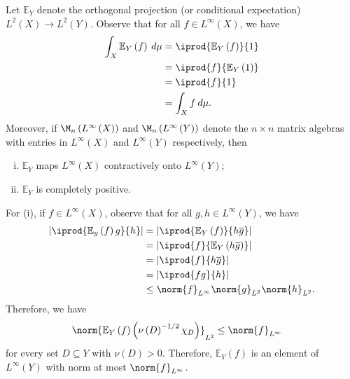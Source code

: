 \documentclass[10pt]{mypackage}
\begin{document}
Let $ \mathbb{E}_Y $ denote the orthogonal projection (or conditional expectation) $L^2\left( X \right)\rightarrow L^2\left( Y \right)$. Observe that for all $f\in L^{\infty}\left( X \right)$, we have
\begin{align*}
  \int_{X}^{} \mathbb{E}_Y\left( f \right)\:d\mu &= \iprod{ \mathbb{E}_Y\left( f \right) }{1}\\
                                                 &= \iprod{f}{ \mathbb{E}_Y\left( 1 \right) }\\
                                                 &= \iprod{f}{1}\\
                                                 &= \int_{X}^{} f\:d\mu.
\end{align*}
Moreover, if $\M_n\left( L^{\infty}\left( X \right) \right)$ and $\M_n\left( L^{\infty}\left( Y \right) \right)$ denote the $n\times n$ matrix algebras with entries in $L^{\infty}\left( X \right)$ and $L^{\infty}\left( Y \right)$ respectively, then
\begin{enumerate}[(i)]
  \item $ \mathbb{E}_Y $ maps $L^{\infty}\left( X \right)$ contractively onto $ L^{\infty}\left( Y \right) $;
  \item $ \mathbb{E}_Y $ is completely positive.
\end{enumerate}
For (i), if $f\in L^{\infty}\left( X \right)$, observe that for all $g,h\in L^{\infty}\left( Y \right)$, we have
\begin{align*}
  \left\vert \iprod{ \mathbb{E}_y\left( f \right)g }{h} \right\vert &= \left\vert \iprod{ \mathbb{E}_Y\left( f \right) }{h \overline{g}} \right\vert\\
                                                                    &= \left\vert \iprod{f}{ \mathbb{E}_Y\left( h \overline{g} \right) } \right\vert\\
                                                                    &= \left\vert \iprod{f}{h \overline{g}} \right\vert\\
                                                                    &= \left\vert \iprod{fg}{h} \right\vert\\
                                                                    &\leq \norm{f}_{L^{\infty}}\norm{g}_{L^2}\norm{h}_{L^2}.
\end{align*}
Therefore, we have
\begin{align*}
  \norm{ \mathbb{E}_Y\left( f \right)\left( \nu\left( D \right)^{-1/2}\chi_{D} \right) }_{L^2} &\leq \norm{f}_{L^{\infty}}
\end{align*}
for every set $D\subseteq Y$ with $\nu(D) > 0$. Therefore, $ \mathbb{E}_Y\left( f \right) $ is an element of $L^{\infty}\left( Y \right)$ with norm at most $\norm{f}_{L^{\infty}}$.
\end{document}
